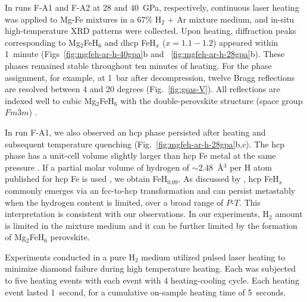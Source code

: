 \documentclass[draft,jgrga,12pt]{agujournal2019}
\begin{document}
In runs F-A1 and F-A2 at 28 and 40~{GPa}, respectively, continuous laser heating was applied to Mg-Fe mixtures in a 67\% H$_2$ + Ar mixture medium, and in-situ high-temperature XRD patterns were collected. 
Upon heating, diffraction peaks corresponding to Mg$_2$FeH$_6$ and dhcp FeH$_x$ ($x =1.1{-}1.2$) appeared within 1~minute (Figs~\ref{fig:mgfeh-ar-h-40gpa}b and ~\ref{fig:mgfeh-ar-h-28gpa}b). 
These phases remained stable throughout ten minutes of heating. 
For the phase assignment, for example, at 1~bar after decompression, twelve Bragg reflections are resolved between 4 and 20 \added{$2\theta$} degrees (Fig.~\ref{fig:gsas-V}). 
All reflections are indexed well to cubic Mg$_2$FeH$_6$ with the double-perovskite structure (space group $Fm\overline{3}m$)  \cite{didisheim_dimagnesium_1984, retuerto_highpressure_2010}. 

In run F-A1, we also observed an hcp phase persisted after heating and subsequent temperature quenching (Fig.~\ref{fig:mgfeh-ar-h-28gpa}b,c).
The hcp phase has a unit-cell volume slightly larger than hcp Fe metal at the same pressure \cite{dewaele_quasihydrostatic_2006}.
If a partial molar volume of hydrogen of $\sim$2.48~{\AA}$^3$ per H atom published for hcp Fe is used , we obtain FeH$_{0.09}$. 
As discussed by , hcp FeH$_x$ commonly emerges via an fcc-to-hcp transformation and can persist metastably when the hydrogen content is limited, over a broad range of $P$-$T$.
This interpretation is consistent with our observations.
In our experiments, H$_2$ amount is limited in the mixture medium and it can be further limited by the formation of Mg$_2$FeH$_6$ perovskite. 



Experiments conducted in a pure H$_2$ medium utilized pulsed laser heating to minimize diamond failure during high temperature heating.  %
Each  was subjected to five heating events with each event with 4 heating-cooling cycle. 
Each heating event lasted 1~second, for a cumulative on-sample heating time of 5~seconds. 
\end{document}
